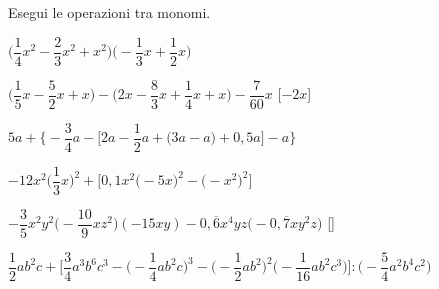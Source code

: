 \begin{esercizio}[\Ast]
 \label{ese:9.34}
Esegui le operazioni tra monomi.

\begin{enumeratea}
 \item 
\(\bigg(\dfrac{1}{4}x^{2}-\dfrac{2}{3}x^{2}+x^{2}\bigg)\bigg(-{\dfrac{1}{3}}
x+\dfrac{1}{2}x\bigg)\)
  \hfill{}
 \item 
\(\bigg(\dfrac{1}{5}x-\dfrac{5}{2}x+x\bigg)-\bigg(2x-\dfrac{8}{3}x+\dfrac{1}{4}
x+x\bigg)-\dfrac{7}{60}x\)
  \hfill[\(-2x\)]
 \item 
\(5a+\Bigg\{-{\dfrac{3}{4}}a-\bigg[2a-\dfrac{1}{2}a+\big(3a-a\big)+0,5a\bigg]
-a\Bigg\}\)
  \hfill{}
 \item 
\(-12x^{2}\bigg(\dfrac{1}{3}x\bigg)^{2}+\bigg[0,1x^{2}\big(-5x\big)^{2}-\big(-x^{
2}\big)^{2}\bigg]\)
  \hfill{}
 \item 
\(-{\dfrac{3}{5}}x^{2}y^{2}\bigg(-{\dfrac{10}{9}}xz^{2}\bigg)(-15xy)-0,\overline{
6}x^{4}yz\big(-0,\overline{7}xy^{2}z\big)\)
  \hfill[]
 \item 
\(\dfrac{1}{2}ab^{2}c+\Bigg[\dfrac{3}{4}a^{3}b^{6}c^{3}-\bigg(-{\dfrac{1}{4}ab^{2
}c}\bigg)^{3}-\bigg(-{\dfrac{1}{2}ab^{2}}\bigg)^{2}\bigg(-{\dfrac{1}{16}ab^{2}c^
{3}}\bigg)\Bigg]:%
 \bigg(-{\dfrac{5}{4}a^{2}b^{4}c^{2}}\bigg)\)
  \hfill{}
\end{enumeratea}
\end{esercizio}

